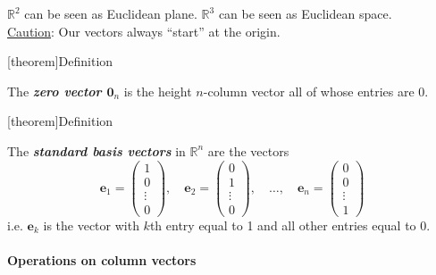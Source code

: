 \documentclass[12pt]{report}
\theoremstyle{definition}
\begin{document}
\begin{ex}
    $\mathbb{R}^{2}$ can be seen as Euclidean plane. $\mathbb{R}^{3}$ can be seen as Euclidean space.
    \\\underline{Caution}: Our vectors always ``start'' at the origin.
\end{ex}

[theorem]{Definition}
\begin{zero vector}
    The \textbf{\emph{zero vector $\mathbf{0}_n$}} is the height $n$-column vector all of whose entries are 0.
\end{zero vector}


[theorem]{Definition}
\begin{standard basis vector}
    The \textbf{\emph{standard basis vectors}} in $\mathbb{R}^{n}$ are the vectors\[
        \mathbf{e}_1 = \begin{pmatrix}
                1\\
                0\\
                \vdots\\
                0
        \end{pmatrix}, \quad
        \mathbf{e}_2 = \begin{pmatrix}
                0\\
                1\\
                \vdots\\
                0
        \end{pmatrix}, \quad \ldots, \quad
        \mathbf{e}_n = \begin{pmatrix}
                0\\
                0\\
                \vdots\\
                1
        \end{pmatrix}
    \]
    i.e. $\mathbf{e}_k$ is the vector with $k$th entry equal to 1 and all other entries equal to 0.
\end{standard basis vector}

\paragraph{Operations on column vectors}
\end{document}
